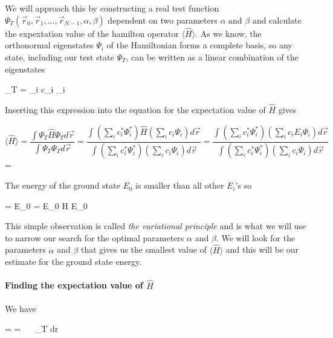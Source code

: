 We will approach this by constructing a real test function $\Psi_T(\vec r_0, \vec r_1, ... , \vec r_{N-1}, \alpha,\beta )$ dependent on two parameters $\alpha$ and $\beta$ and calculate the expextation value of the hamilton operator $\langle \hat{H} \rangle $. 
As we know, the orthonormal eigenstates $\Psi_i$ of the Hamiltonian forms a complete basis, so any state, including our test state $\Psi_T$, can be written as a linear combination of the eigenstates 

\eqs
\Psi_T = \sum_i c_i \Psi_i
\eqf

Inserting this expression into the equation for the expectation value of $\hat{H}$ gives

\[
\langle \hat{H} \rangle = \frac{\int \Psi_T \hat{H} \Psi_T d\vec r}{ \int \Psi_T \Psi_T d\vec r} 
= \frac{\int \left ( \sum_i c_i^* \Psi_i^* \right ) \hat{H} \left ( \sum_i c_i \Psi_i \right ) d\vec r}{ \int \left ( \sum_i c_i^* \Psi_i^*  \right ) \left ( \sum_i c_i \Psi_i \right ) d\vec r}
=
\frac{\int \left ( \sum_i c_i^* \Psi_i^* \right ) \left ( \sum_i c_i  E_i \Psi_i \right ) d\vec r}{ \int \left ( \sum_i c_i^* \Psi_i^* \right ) \left ( \sum_i c_i \Psi_i \right ) d\vec r}
\]
\eqs
=
\eqf

The energy of the ground state $E_0$ is smaller than all other $E_i$'s so 

\eqs
{} \geq {} = E_0  = E_0
\eqf
\eqs
\langle H \rangle \geq E_0
\eqf

This simple observation is called \textit{the variational principle} and is what we will use to narrow our search for the optimal parameters $\alpha$ and $\beta$.
We will look for the parameters $\alpha$ and $\beta$ that gives us the smallest value of $\langle \hat{H} \rangle$ and this will be our estimate for the ground state energy.







\paragraph{Finding the expectation value of $\hat{H}$}

We have

\eqs
\langle {} \rangle =  
=
\int ~~   \Psi_T d\vec r
\eqf

